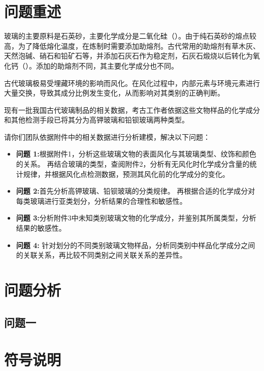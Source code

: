 
\section{问题重述}

玻璃的主要原料是石英砂，主要化学成分是二氧化硅（）。由于纯石英砂的熔点较高，为了降低熔化温度，在炼制时需要添加助熔剂。古代常用的助熔剂有草木灰、天然泡碱、硝石和铅矿石等，并添加石灰石作为稳定剂，石灰石煅烧以后转化为氧化钙（）。添加的助熔剂不同，其主要化学成分也不同。

古代玻璃极易受埋藏环境的影响而风化。在风化过程中，内部元素与环境元素进行大量交换，导致其成分比例发生变化，从而影响对其类别的正确判断。

现有一批我国古代玻璃制品的相关数据，考古工作者依据这些文物样品的化学成分和其他检测手段已将其分为高钾玻璃和铅钡玻璃两种类型。

请你们团队依据附件中的相关数据进行分析建模，解决以下问题：

\begin{itemize}

\item \textbf{问题 1:}根据附件1，分析这些玻璃文物的表面风化与其玻璃类型、纹饰和颜色的关系。
再结合玻璃的类型，查阅附件2，分析有无风化时化学成分含量的统计规律，并根据风化点检测数据，预测其风化前的化学成分的变化。

\item \textbf{问题 2:}首先分析高钾玻璃、铅钡玻璃的分类规律。
再根据合适的化学成分对每类玻璃进行亚类划分，分析结果的合理性和敏感性。

\item \textbf{问题 3:}分析附件3中未知类别玻璃文物的化学成分，并鉴别其所属类型，分析结果的敏感性。

\item \textbf{问题 4: }针对划分的不同类别玻璃文物样品，分析同类别中样品化学成分之间的关联关系，再比较不同类别之间关联关系的差异性。

\end{itemize}


\section{问题分析} %
\label{sec:问题分析}

\subsection{问题一} %
\label{sub:问题一}








\section{符号说明} %
\label{sec:符号说明}

